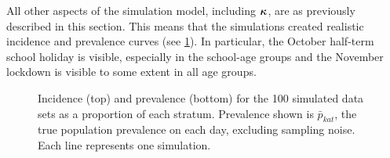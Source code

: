 \documentclass[thesis.tex]{subfiles}
\begin{document}
All other aspects of the simulation model, including $\bm{\kappa}$, are as previously described in this section.
This means that the simulations created realistic incidence and prevalence curves (see \cref{SEIR:fig:sim-data}).
In particular, the October half-term school holiday is visible, especially in the school-age groups and the November lockdown is visible to some extent in all age groups.
\begin{figure}
    \vspace{-3cm}
    \caption[Simulated data]{%
        Incidence (top) and prevalence (bottom) for the 100 simulated data sets as a proportion of each stratum.
        Prevalence shown is $\bar{p}_{kat}$, the true population prevalence on each day, excluding sampling noise.
        Each line represents one simulation.
    }
    \label{SEIR:fig:sim-data}
\end{figure}
\end{document}
